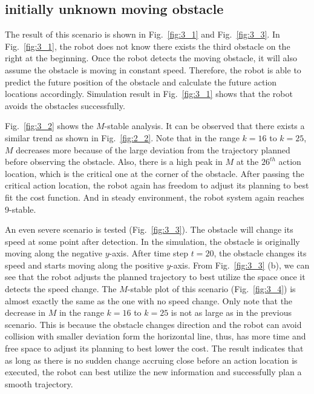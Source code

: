 \documentclass{ifacconf}
\begin{document}
\subsection{initially unknown moving obstacle}

The result of this scenario is shown in Fig.~\ref{fig:3_1} and Fig.~\ref{fig:3_3}. In Fig.~\ref{fig:3_1}, the robot does not know there exists the third obstacle on the right at the beginning. Once the robot detects the moving obstacle, it will also assume the obstacle is moving in constant speed. Therefore, the robot is able to predict the future position of the obstacle and calculate the future action locations accordingly. Simulation result in Fig.~\ref{fig:3_1} shows that the robot avoids the obstacles successfully.

Fig.~\ref{fig:3_2} shows the $M$-stable analysis. It can be observed that there exists a similar trend as shown in Fig.~\ref{fig:2_2}. Note that in the range $k=16$ to $k=25$, $M$ decreases more because of the large deviation from the trajectory planned before observing the obstacle. Also, there is a high peak in $M$ at the $26^{th}$ action location, which is the critical one at the corner of the obstacle. After passing the critical action location, the robot again has freedom to adjust its planning to best fit the cost function. And in steady environment, the robot system again reaches 9-stable. 

An even severe scenario is tested (Fig.~\ref{fig:3_3}). The obstacle will change its speed at some point after detection. In the simulation, the obstacle is originally moving along the negative $y$-axis. After time step $t=20$, the obstacle changes its speed and starts moving along the positive $y$-axis. From Fig.~\ref{fig:3_3} (b), we can see that the robot adjusts the planned trajectory to best utilize the space once it detects the speed change. The $M$-stable plot of this scenario (Fig.~\ref{fig:3_4}) is almost exactly the same as the one with no speed change. Only note that the decrease in $M$ in the range $k=16$ to $k=25$ is not as large as in the previous scenario. This is because the obstacle changes direction and the robot can avoid collision with smaller deviation form the horizontal line, thus, has more time and free space to adjust its planning to best lower the cost. The result indicates that as long as there is no sudden change accruing close before an action location is executed, the robot can best utilize the new information and successfully plan a smooth trajectory.
\end{document}
